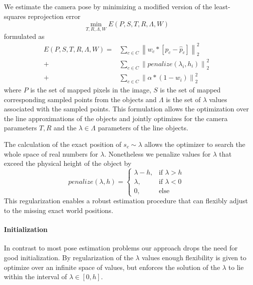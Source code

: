 We estimate the camera pose by minimizing a modified version of the least-squares reprojection error 
\begin{equation}
  \label{eq:static_calibration_error}
  \min_{T, R, \Lambda, W} E(P, S, T, R, \Lambda, W) 
\end{equation}
formulated as
\begin{equation}
  \begin{split}
  E(P, S, T, R, \Lambda, W ) =& 
  \sum_{c \in C} 
  \left\lVert 
    w_c * [ p_c - \hat{p}_c ]
  \right\rVert_2^2 \\ 
  +& 
  \sum_{c \in C} 
  \left\lVert 
  penalize(\lambda_i, h_i)
  \right\rVert_2^2 \\ 
  +& 
  \sum_{c \in C} 
  \left\lVert 
  \alpha * (1 - w_i)
  \right\rVert_2^2 
\end{split}
\label{eq:reprojection_error}
\end{equation}
where $P$ is the set of mapped pixels in the image, $S$ is the set of mapped corresponding sampled points from the objects and $\Lambda$ is the set of $\lambda$ values associated with the sampled points.
This formulation allows the optimization over the line approximations of the objects and jointly optimizes for the camera parameters $T, R$ and the $\lambda \in \Lambda$ parameters of the line objects.

The calculation of the exact position of $s_c \sim \lambda$ allows the optimizer to search the whole space of real numbers for $\lambda$.
Nonetheless we penalize values for $\lambda$ that exceed the physical height of the object by 
\begin{equation}
    penalize(\lambda, h) =
    \begin{cases}
      \lambda - h,& \text{if } \lambda > h\\
      \lambda,    & \text{if } \lambda < 0\\
      0,    & \text{else}
    \end{cases} 
\end{equation}
This regularization enables a robust estimation procedure that can flexibly adjust to the missing exact world positions.

\paragraph{Initialization}
In contrast to most pose estimation problems our approach drops the need for good initialization. 
By regularization of the $\lambda$ values enough flexibility is given to optimize over an infinite space of values, 
but enforces the solution of the $\lambda$ to lie within the interval of $\lambda \in [0, h]$.


